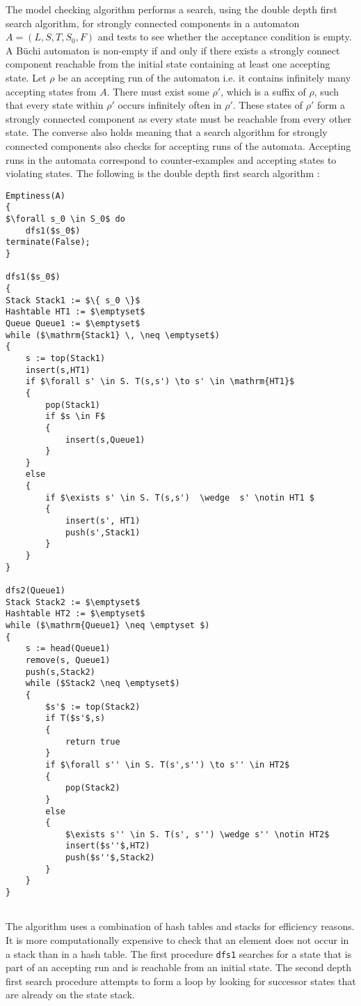 The model checking algorithm performs a search, using the double depth first search algorithm, for strongly connected components in a \Buchi automaton $A = (L,S,T, S_0, F)$ and tests to see whether the acceptance condition is empty. A B{\"u}chi automaton is non-empty if and only if there exists a strongly connect component reachable from the initial state containing at least one accepting state. Let $\rho$ be an accepting run of the automaton i.e. it contains infinitely many accepting states from $A$.  There must exist some $\rho'$, which is a suffix of $\rho$, such that every state within $\rho'$ occurs infinitely often in $\rho'$. These states of $\rho'$ form a strongly connected component as every state must be reachable from every other state. The converse also holds meaning that a search algorithm for strongly connected components also checks for accepting runs of the automata. Accepting runs in the automata correspond to counter-examples and accepting states to violating states. The following is the double depth first search algorithm \cite{CC91,GH96}:

\begin{lstlisting}[caption = The Double Depth First Search Algorithm, mathescape]
Emptiness(A)
{
$\forall s_0 \in S_0$ do
	dfs1($s_0$)
terminate(False);
}

dfs1($s_0$)
{
Stack Stack1 := $\{ s_0 \}$
Hashtable HT1 := $\emptyset$
Queue Queue1 := $\emptyset$
while ($\mathrm{Stack1} \, \neq \emptyset$)
{
    s := top(Stack1) 
    insert(s,HT1)
    if $\forall s' \in S. T(s,s') \to s' \in \mathrm{HT1}$
    {
        pop(Stack1)
        if $s \in F$
        {
            insert(s,Queue1)
        }
    }
    else
    {
        if $\exists s' \in S. T(s,s')  \wedge  s' \notin HT1 $ 
        {
            insert(s', HT1)
            push(s',Stack1)
        }
    }
}

dfs2(Queue1)
Stack Stack2 := $\emptyset$
Hashtable HT2 := $\emptyset$
while ($\mathrm{Queue1} \neq \emptyset $)
{
    s := head(Queue1)
    remove(s, Queue1)
    push(s,Stack2)
    while ($Stack2 \neq \emptyset$)
    {
        $s'$ := top(Stack2)
        if T($s'$,s)
        {
            return true
        }
        if $\forall s'' \in S. T(s',s'') \to s'' \in HT2$
        {
            pop(Stack2)
        }
        else
        {
            $\exists s'' \in S. T(s', s'') \wedge s'' \notin HT2$
            insert($s''$,HT2)
            push($s''$,Stack2)    
        }
    } 
}


\end{lstlisting}

The algorithm uses a combination of hash tables and stacks for efficiency reasons. It is more computationally expensive to check that an element does not occur in a stack than in a hash table. The first procedure \texttt{dfs1} searches for a state that is part of an accepting run and  is reachable from an initial state. The second depth first search procedure attempts to form a loop by looking for successor states that are already on the state stack. 



